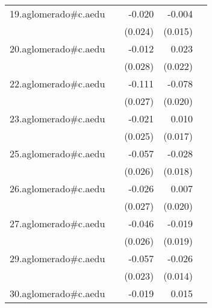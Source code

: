 {\begin{longtable}{l*{4}{D{.}{.}{-1}}}
\addlinespace
19.aglomerado#c.aedu&                     &      -0.020         &      -0.004         &                     \\
            &                     &     (0.024)         &     (0.015)         &                     \\
\addlinespace
20.aglomerado#c.aedu&                     &      -0.012         &       0.023         &                     \\
            &                     &     (0.028)         &     (0.022)         &                     \\
\addlinespace
22.aglomerado#c.aedu&                     &      -0.111\sym{***}&      -0.078\sym{***}&                     \\
            &                     &     (0.027)         &     (0.020)         &                     \\
\addlinespace
23.aglomerado#c.aedu&                     &      -0.021         &       0.010         &                     \\
            &                     &     (0.025)         &     (0.017)         &                     \\
\addlinespace
25.aglomerado#c.aedu&                     &      -0.057\sym{*}  &      -0.028         &                     \\
            &                     &     (0.026)         &     (0.018)         &                     \\
\addlinespace
26.aglomerado#c.aedu&                     &      -0.026         &       0.007         &                     \\
            &                     &     (0.027)         &     (0.020)         &                     \\
\addlinespace
27.aglomerado#c.aedu&                     &      -0.046         &      -0.019         &                     \\
            &                     &     (0.026)         &     (0.019)         &                     \\
\addlinespace
29.aglomerado#c.aedu&                     &      -0.057\sym{*}  &      -0.026         &                     \\
            &                     &     (0.023)         &     (0.014)         &                     \\
\addlinespace
30.aglomerado#c.aedu&                     &      -0.019         &       0.015         &                     \\

\end{longtable}}
